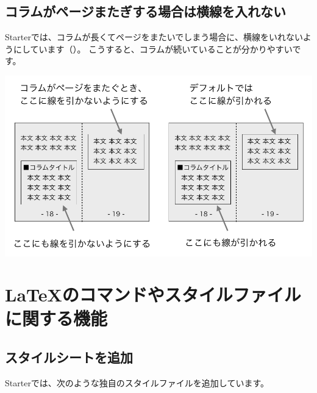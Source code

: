 \subsection*{コラムがページまたぎする場合は横線を入れない}
\label{sec:1-2-18}

Starterでは、コラムが長くてページをまたいでしまう場合に、横線をいれないようにしています（）。
こうすると、コラムが続いていることが分かりやすいです。

\begin{reviewimage}%
\includegraphics[width=0.8\maxwidth]{./images/chap01-starter/column_openframe.png}%
\label{image:chap01-starter:column_openframe}
\end{reviewimage}

\section{\LaTeX{}のコマンドやスタイルファイルに関する機能}
\label{sec:1-3}
\label{sec-sty}

\subsection*{スタイルシートを追加}
\label{sec:1-3-1}

Starterでは、次のような独自のスタイルファイルを追加しています。

